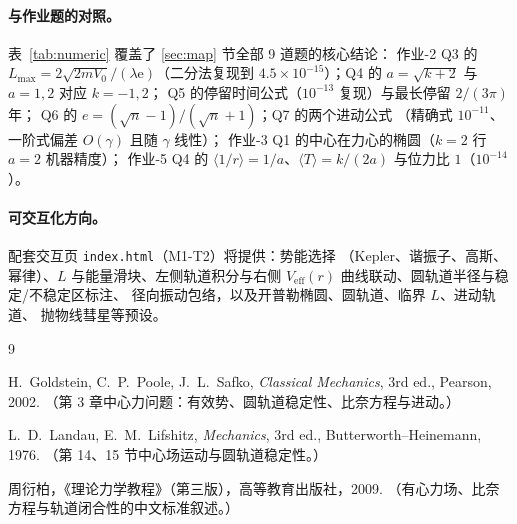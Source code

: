 \documentclass[UTF8,a4paper,11pt]{ctexart}
\begin{document}
\paragraph{与作业题的对照。}
表~\ref{tab:numeric} 覆盖了 \ref{sec:map} 节全部 9 道题的核心结论：
作业-2 Q3 的 $L_{\max}=2\sqrt{2mV_0}/(\lambda\mathrm{e})$（二分法复现到
$4.5\times10^{-15}$）；Q4 的 $a=\sqrt{k+2}$ 与 $a=1,2$ 对应 $k=-1,2$；
Q5 的停留时间公式（$10^{-13}$ 复现）与最长停留 $2/(3\pi)$ 年；
Q6 的 $e=(\sqrt n-1)/(\sqrt n+1)$；Q7 的两个进动公式
（精确式 $10^{-11}$、一阶式偏差 $O(\gamma)$ 且随 $\gamma$ 线性）；
作业-3 Q1 的中心在力心的椭圆（$k=2$ 行 $a=2$ 机器精度）；
作业-5 Q4 的 $\langle1/r\rangle=1/a$、$\langle T\rangle=k/(2a)$
与位力比 $1$（$10^{-14}$）。

\paragraph{可交互化方向。}
配套交互页 \texttt{index.html}（M1-T2）将提供：势能选择
（Kepler、谐振子、高斯、幂律）、$L$ 与能量滑块、左侧轨道积分与右侧
$V_{\mathrm{eff}}(r)$ 曲线联动、圆轨道半径与稳定/不稳定区标注、
径向振动包络，以及开普勒椭圆、圆轨道、临界 $L$、进动轨道、
抛物线彗星等预设。

\begin{thebibliography}{9}

H.~Goldstein, C.~P.~Poole, J.~L.~Safko,
\emph{Classical Mechanics}, 3rd ed., Pearson, 2002.
（第 3 章中心力问题：有效势、圆轨道稳定性、比奈方程与进动。）

L.~D.~Landau, E.~M.~Lifshitz,
\emph{Mechanics}, 3rd ed., Butterworth--Heinemann, 1976.
（第 14、15 节中心场运动与圆轨道稳定性。）

周衍柏，《理论力学教程》（第三版），高等教育出版社，2009.
（有心力场、比奈方程与轨道闭合性的中文标准叙述。）

\end{thebibliography}
\end{document}
